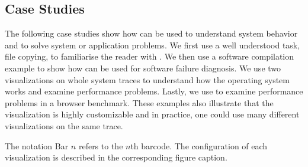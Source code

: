 \subsection{Case Studies}
\label{sec:lviz-study}

The following case studies show how \lviz{} can be used to
understand system behavior and to solve system or application problems.
We first use a well understood task, file copying,
to familiarise the reader with \VDP{}.
We then use a software compilation example to show how \VDP{} can
be used for software failure diagnosis.
We use two visualizations on whole system traces to understand
how the operating system works and examine performance problems.
Lastly, we use \VDP{} to examine performance problems in a browser benchmark.
These examples also illustrate that the \VDP{} visualization is highly
customizable and in practice, one could use many different visualizations
on the same trace.


The notation Bar $n$ refers to the $n$th barcode.
The configuration of each visualization is described in the corresponding
figure caption.





%

%
%
